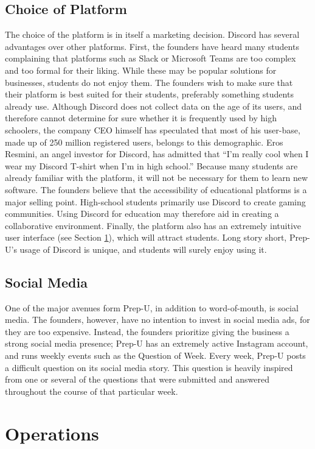 \documentclass{business}
\begin{document}
    \subsection{Choice of Platform}\label{choice-of-platform}
    The choice of the platform is in itself a marketing decision. Discord has several advantages over other platforms. First, the founders have heard many students complaining that platforms such as Slack or Microsoft Teams are too complex and too formal for their liking. While these may be popular solutions for businesses, students do not enjoy them. The founders wish to make sure that their platform is best suited for their students, preferably something students already use. Although Discord does not collect data on the age of its users, and therefore cannot determine for sure whether it is frequently used by high schoolers, the company CEO himself has speculated that most of his user-base, made up of 250 million registered users, \cite{Sherr2019} belongs to this demographic. Eros Resmini, an angel investor for Discord, has admitted that “I’m really cool when I wear my Discord T-shirt when I’m in high school.” \cite{Jargon2019} Because many students are already familiar with the platform, it will not be necessary for them to learn new software. The founders believe that the accessibility of educational platforms is a major selling point. High-school students primarily use Discord to create gaming communities. Using Discord for education may therefore aid in creating a collaborative environment. Finally, the platform also has an extremely intuitive user interface (see Section \ref{operations}), which will attract students. Long story short, Prep-U’s usage of Discord is unique, and students will surely enjoy using it. 
    \subsection{Social Media}
    One of the major avenues form Prep-U, in addition to word-of-mouth, is social media. The founders, however, have no intention to invest in social media ads, for they are too expensive. Instead, the founders prioritize giving the business a strong social media presence; Prep-U has an extremely active Instagram account, and runs weekly events such as the Question of Week. Every week, Prep-U posts a difficult question on its social media story. This question is heavily inspired from one or several of the questions that were submitted and answered throughout the course of that particular week.
    \section{Operations}\label{operations}
\end{document}
